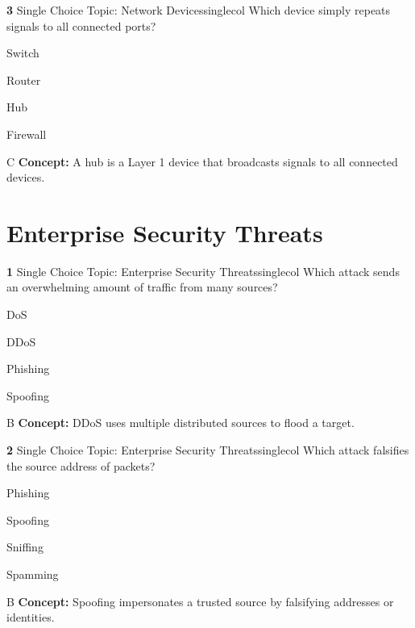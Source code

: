 \documentclass[10pt,a4paper]{article}
\begin{document}
\begin{qcard}{\color{white}\textbf{3} \hfill \small Single Choice \textbar{} Topic: Network Devices}{singlecol}
Which device simply repeats signals to all connected ports?

\begin{qoptions}
\item Switch
\item Router
\item Hub
\item Firewall
\end{qoptions}
\begin{explainbox}{C}
\textbf{Concept:} A hub is a Layer 1 device that broadcasts signals to all connected devices.
\end{explainbox}
\end{qcard}

\section{Enterprise Security Threats}
\begin{qcard}{\color{white}\textbf{1} \hfill \small Single Choice \textbar{} Topic: Enterprise Security Threats}{singlecol}
Which attack sends an overwhelming amount of traffic from many sources?

\begin{qoptions}
\item DoS
\item DDoS
\item Phishing
\item Spoofing
\end{qoptions}
\begin{explainbox}{B}
\textbf{Concept:} DDoS uses multiple distributed sources to flood a target.
\end{explainbox}
\end{qcard}

\begin{qcard}{\color{white}\textbf{2} \hfill \small Single Choice \textbar{} Topic: Enterprise Security Threats}{singlecol}
Which attack falsifies the source address of packets?

\begin{qoptions}
\item Phishing
\item Spoofing
\item Sniffing
\item Spamming
\end{qoptions}
\begin{explainbox}{B}
\textbf{Concept:} Spoofing impersonates a trusted source by falsifying addresses or identities.
\end{explainbox}
\end{qcard}
\end{document}
